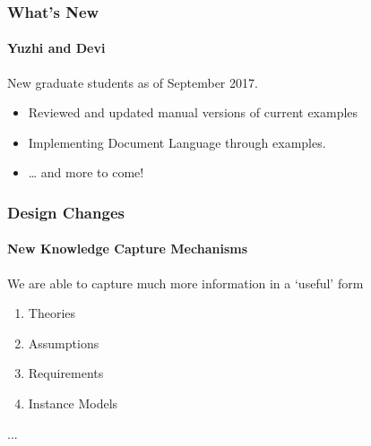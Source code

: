 \documentclass{beamer}
\begin{document}

\begin{frame}

\frametitle{What's New}
\framesubtitle{Yuzhi and Devi}

New graduate students as of September 2017.

\begin{itemize}
\item Reviewed and updated manual versions of current examples
\item Implementing Document Language through examples.
\item \ldots{} and more to come!
\end{itemize}

\end{frame}


\begin{frame}

\frametitle{Design Changes}
\framesubtitle{New Knowledge Capture Mechanisms}

We are able to capture much more information in a `useful' form

\begin{enumerate}
	\item Theories
	\item Assumptions
	\item Requirements
	\item Instance Models
\end{enumerate}
...

\end{frame}


%
%


%
%
%
\end{document}
